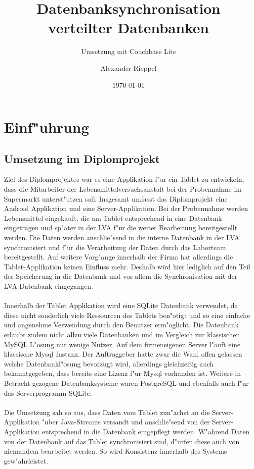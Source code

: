 \documentclass[a4paper,14pt]{scrreprt}
\begin{document}
\author{Alexander Rieppel} %
\title{Datenbanksynchronisation verteilter Datenbanken} %
\subject{VSDB} %
\subtitle{Umsetzung mit Couchbase Lite} %
\date{\today} %
\publishers{5AHITT} %

\maketitle
\tableofcontents
 

\chapter{Einf"uhrung}
\section{Umsetzung im Diplomprojekt}
Ziel des Diplomprojektes war es eine Applikation f"ur ein Tablet zu entwickeln, dass die Mitarbeiter der Lebensmittelversuchsanstalt bei der Probennahme im Supermarkt unterst"utzen soll. Insgesamt umfasst das Diplomprojekt eine Android Applikation und eine Server-Applikation. Bei der Probennahme werden Lebensmittel eingekauft, die am Tablet entsprechend in eine Datenbank eingetragen und sp"ater in der LVA f"ur die weiter Bearbeitung bereitgestellt werden. Die Daten werden anschlie"send in die interne Datenbank in der LVA synchronisiert und f"ur die Verarbeitung der Daten durch das Laborteam bereitgestellt. Auf weitere Vorg"ange innerhalb der Firma hat allerdings die Tablet-Applikation keinen Einfluss mehr. Deshalb wird hier lediglich auf den Teil der Speicherung in die Datenbank und vor allem die Synchronisation mit der LVA-Datenbank eingegangen. \\\\Innerhalb der Tablet Applikation wird eine SQLite Datenbank verwendet, da diese nicht sonderlich viele Ressourcen des Tablets ben"otigt und so eine einfache und angenehme Verwendung durch den Benutzer erm"oglicht. Die Datenbank erlaubt zudem nicht allzu viele Datenbanken und im Vergleich zur klassischen MySQL L"osung nur wenige Nutzer. Auf dem firmeneigenen Server l"auft eine klassische Mysql Instanz. Der Auftraggeber hatte zwar die Wahl offen gelassen welche Datenbankl"osung bevorzugt wird, allerdings gleichzeitig auch bekanntgegeben, dass bereits eine Lizenz f"ur Mysql vorhanden ist. Weitere in Betracht gezogene Datenbanksysteme waren PostgreSQL und ebenfalls auch f"ur das Serverprogramm SQLite. \\\\ Die Umsetzung sah so aus, dass Daten vom Tablet zun"achst an die Server-Applikation "uber Java-Streams versandt und anschlie"send von der Server-Applikation entsprechend in die Datenbank eingepflegt werden. W"ahrend Daten von der Datenbank auf das Tablet synchronisiert sind, d"urfen diese auch von niemandem bearbeitet werden. So wird Konsistenz innerhalb des Systems gew"ahrleistet.\cite{diploMeins}
\end{document}
